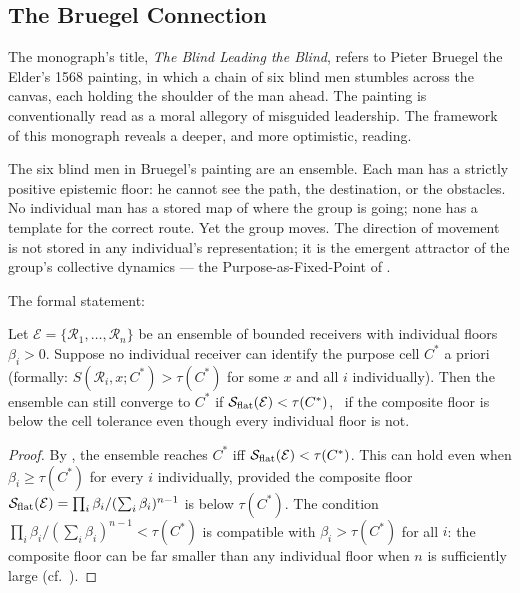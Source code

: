 \subsection{The Bruegel Connection}

The monograph's title, \emph{The Blind Leading the Blind}, refers to Pieter
Bruegel the Elder's 1568 painting, in which a chain of six blind men stumbles
across the canvas, each holding the shoulder of the man ahead.  The painting
is conventionally read as a moral allegory of misguided leadership.  The
framework of this monograph reveals a deeper, and more optimistic, reading.

The six blind men in Bruegel's painting are an ensemble.  Each man has a
strictly positive epistemic floor: he cannot see the path, the destination,
or the obstacles.  No individual man has a stored map of where the group is
going; none has a template for the correct route.  Yet the group moves.
The direction of movement is not stored in any individual's representation;
it is the emergent attractor of the group's collective dynamics — the
Purpose-as-Fixed-Point of .

The formal statement:

\begin{proposition}
\label{prop:blind-leading-blind}
Let $\mathcal{E} = \{\mathcal{R}_1, \ldots, \mathcal{R}_n\}$ be an ensemble
of bounded receivers with individual floors $\beta_i > 0$.  Suppose no
individual receiver can identify the purpose cell $C^*$ a priori (formally:
$S(\mathcal{R}_i, x; C^*) > \tau(C^*)$ for some $x$ and all $i$ individually).
Then the ensemble can still converge to $C^*$ if $\mathcal{S}_{\mathrm{flat}}(\mathcal{E})
< \tau(C^*)$, \ie\ if the composite floor is below the cell tolerance even
though every individual floor is not.
\end{proposition}

\begin{proof}
By , the ensemble reaches $C^*$ iff
$\mathcal{S}_{\mathrm{flat}}(\mathcal{E}) < \tau(C^*)$.  This can hold even when
$\beta_i \geq \tau(C^*)$ for every $i$ individually, provided the composite
floor $\mathcal{S}_{\mathrm{flat}}(\mathcal{E}) = \prod_i \beta_i / (\sum_i \beta_i)^{n-1}$
is below $\tau(C^*)$.  The condition
$\prod_i \beta_i / (\sum_i \beta_i)^{n-1} < \tau(C^*)$
is compatible with $\beta_i > \tau(C^*)$ for all $i$: the composite floor
can be far smaller than any individual floor when $n$ is sufficiently large
(cf.\ ).
\end{proof}

